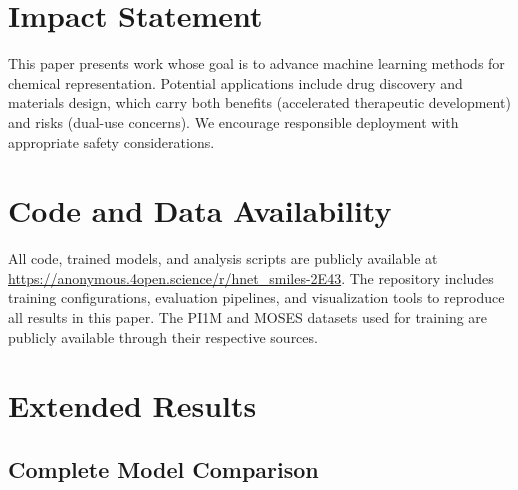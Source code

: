 \documentclass{article}
\begin{document}
\section*{Impact Statement}

This paper presents work whose goal is to advance machine learning methods for chemical representation. Potential applications include drug discovery and materials design, which carry both benefits (accelerated therapeutic development) and risks (dual-use concerns). We encourage responsible deployment with appropriate safety considerations.

\section*{Code and Data Availability}

All code, trained models, and analysis scripts are publicly available at \url{https://anonymous.4open.science/r/hnet_smiles-2E43}. The repository includes training configurations, evaluation pipelines, and visualization tools to reproduce all results in this paper. The PI1M and MOSES datasets used for training are publicly available through their respective sources.





\newpage
\appendix
\onecolumn

\section{Extended Results}
\label{app:results}

\subsection{Complete Model Comparison}
\end{document}
